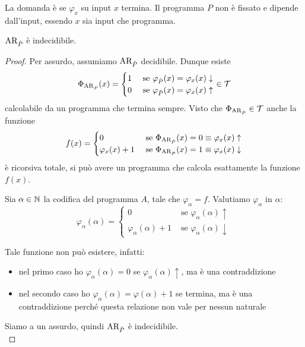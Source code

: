 La domanda è se $\varphi_x$ su input $x$ termina. Il programma $P$ non è fissato e dipende dall'input, essendo $x$ sia input che programma.\\

\begin{theor}
	$\text{AR}_{\hat{P}}$ è indecidibile.
\end{theor}
\begin{proof}
	Per assurdo, assumiamo $\text{AR}_{\hat{P}}$ decidibile. Dunque esiste
	$$
	\Phi_{\text{AR}_{\hat{P}}} (x) = \begin{cases}
		1 & \text{ se } \varphi_{\hat{P}} (x) = \varphi_x (x) \downarrow \\
		0 & \text{ se } \varphi_{\hat{P}} (x) = \varphi_x (x) \uparrow \\
	\end{cases}
	\in \mathcal{T}
	$$
	calcolabile da un programma che termina sempre. Visto che $\Phi_{\text{AR}_{\hat{P}}} \in \mathcal{T}$ anche la funzione
	$$
	f(x) = \begin{cases}
		0 & \text{ se } \Phi_{\text{AR}_{\hat{P}}} (x) = 0 \equiv \varphi_x (x) \uparrow \\
		\varphi_x (x) + 1 & \text{ se } \Phi_{\text{AR}_{\hat{P}}} (x) = 1 \equiv \varphi_x (x) \downarrow
	\end{cases}
	$$
	è ricorsiva totale, si può avere un programma che calcola esattamente la funzione $f(x)$.

	Sia $\alpha \in \mathbb{N}$ la codifica del programma $A$, tale che $\varphi_\alpha = f$.  Valutiamo $\varphi_\alpha$ in $\alpha$:
	$$
	\varphi_\alpha (\alpha) = \begin{cases}
		0 & \text{ se } \varphi_\alpha (\alpha) \uparrow \\
		\varphi_\alpha (\alpha) + 1 & \text{ se } \varphi_\alpha(\alpha) \downarrow
	\end{cases}
	$$

	Tale funzione non può esistere, infatti:
	\begin{itemize}
		\item nel primo caso ho $\varphi_\alpha (\alpha) = 0$ se $\varphi_\alpha(\alpha) \uparrow$, ma è una contraddizione
		\item nel secondo caso ho $\varphi_\alpha (\alpha) = \varphi(\alpha) + 1$ se termina, ma è una contraddizione perché questa relazione non vale per nessun naturale
	\end{itemize}

	Siamo a un assurdo, quindi $\text{AR}_{\hat{P}}$ è indecidibile. \\
\end{proof}


